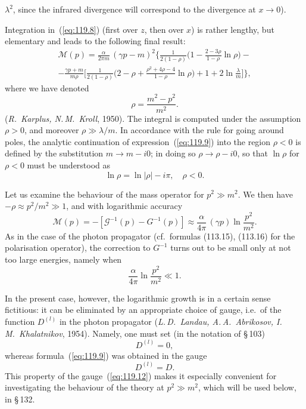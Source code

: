 
\noindent $\lambda^2$, since the infrared divergence will correspond to the divergence at $x \to 0$).

Integration in~(\ref{eq:119.8}) (first over $z$, then over $x$) is rather lengthy, but elementary and leads to the following final result:
\begin{multline}
\mathcal{M}(p) = \frac{\alpha}{2\pi m}\,(\gamma p - m)^2 \bigg\{\frac{1}{2(1-\rho)}\bigg(1 - \frac{2-3\rho}{1-\rho}\ln\rho\bigg) - \\
- \frac{\gamma p + m}{m\rho}\bigg[\frac{1}{2(1-\rho)}\bigg(2 - \rho + \frac{\rho^2 + 4\rho - 4}{1-\rho}\ln\rho\bigg) + 1 + 2\ln\frac{\lambda}{m}\bigg]\bigg\},
\label{eq:119.9}
\end{multline}
where we have denoted
\[
\rho = \frac{m^2 - p^2}{m^2}.
\]
(\emph{R.~Karplus, N.\,M.~Kroll}, 1950). The integral is computed under the assumption $\rho > 0$, and moreover $\rho \gg \lambda/m$. In accordance with the rule for going around poles, the analytic continuation of expression~(\ref{eq:119.9}) into the region $\rho < 0$ is defined by the substitution $m \to m - i0$; in doing so $\rho \to \rho - i0$, so that $\ln\rho$ for $\rho < 0$ must be understood as
\begin{equation}
\ln\rho = \ln|\rho| - i\pi, \quad \rho < 0.
\label{eq:119.10}
\end{equation}

Let us examine the behaviour of the mass operator for $p^2 \gg m^2$. We then have $-\rho \approx p^2/m^2 \gg 1$, and with logarithmic accuracy
\begin{equation}
\mathcal{M}(p) = -[\mathcal{G}^{-1}(p) - G^{-1}(p)] \approx \frac{\alpha}{4\pi}\,(\gamma p)\ln\frac{p^2}{m^2}.
\label{eq:119.11}
\end{equation}
As in the case of the photon propagator (cf.\ formulas (113.15), (113.16) for the polarisation operator), the correction to $G^{-1}$ turns out to be small only at not too large energies, namely when
\[
\frac{\alpha}{4\pi}\ln\frac{p^2}{m^2} \ll 1.
\]

In the present case, however, the logarithmic growth is in a certain sense fictitious: it can be eliminated by an appropriate choice of gauge, i.e.\ of the function $D^{(l)}$ in the photon propagator (\emph{L.\,D.~Landau, A.\,A.~Abrikosov, I.\,M.~Khalatnikov}, 1954). Namely, one must set (in the notation of \S\,103)
\begin{equation}
D^{(l)} = 0,
\label{eq:119.12}
\end{equation}
whereas formula~(\ref{eq:119.9}) was obtained in the gauge
\begin{equation}
D^{(l)} = D.
\label{eq:119.13}
\end{equation}
This property of the gauge~(\ref{eq:119.12}) makes it especially convenient for investigating the behaviour of the theory at $p^2 \gg m^2$, which will be used below, in \S\,132.

